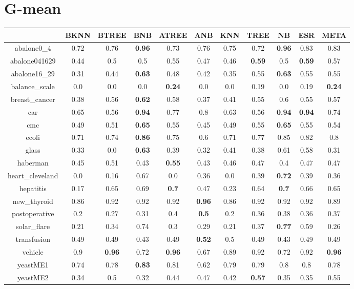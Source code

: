 \documentclass{article}%
\begin{document}
\section*{G{-}mean}%
\begin{tabular}{c|cccccccccc}%
\hline%
&BKNN&BTREE&BNB&ATREE&ANB&KNN&TREE&NB&ESR&META\\%
\hline%
abalone0\_4&0.72&0.76&\textbf{0.96}&0.73&0.76&0.75&0.72&\textbf{0.96}&0.83&0.83\\%
\hline%
abalone041629&0.44&0.5&0.5&0.55&0.47&0.46&\textbf{0.59}&0.5&\textbf{0.59}&0.57\\%
\hline%
abalone16\_29&0.31&0.44&\textbf{0.63}&0.48&0.42&0.35&0.55&\textbf{0.63}&0.55&0.55\\%
\hline%
balance\_scale&0.0&0.0&0.0&\textbf{0.24}&0.0&0.0&0.19&0.0&0.19&\textbf{0.24}\\%
\hline%
breast\_cancer&0.38&0.56&\textbf{0.62}&0.58&0.37&0.41&0.55&0.6&0.55&0.57\\%
\hline%
car&0.65&0.56&\textbf{0.94}&0.77&0.8&0.63&0.56&\textbf{0.94}&\textbf{0.94}&0.74\\%
\hline%
cmc&0.49&0.51&\textbf{0.65}&0.55&0.45&0.49&0.55&\textbf{0.65}&0.55&0.54\\%
\hline%
ecoli&0.71&0.74&\textbf{0.86}&0.75&0.6&0.71&0.77&0.85&0.82&0.8\\%
\hline%
glass&0.33&0.0&\textbf{0.63}&0.39&0.32&0.41&0.38&0.61&0.58&0.31\\%
\hline%
haberman&0.45&0.51&0.43&\textbf{0.55}&0.43&0.46&0.47&0.4&0.47&0.47\\%
\hline%
heart\_cleveland&0.0&0.16&0.67&0.0&0.36&0.0&0.39&\textbf{0.72}&0.39&0.36\\%
\hline%
hepatitis&0.17&0.65&0.69&\textbf{0.7}&0.47&0.23&0.64&\textbf{0.7}&0.66&0.65\\%
\hline%
new\_thyroid&0.86&0.92&0.92&0.92&\textbf{0.96}&0.86&0.92&0.92&0.92&0.89\\%
\hline%
postoperative&0.2&0.27&0.31&0.4&\textbf{0.5}&0.2&0.36&0.38&0.36&0.37\\%
\hline%
solar\_flare&0.21&0.34&0.74&0.3&0.29&0.21&0.37&\textbf{0.77}&0.59&0.26\\%
\hline%
transfusion&0.49&0.49&0.43&0.49&\textbf{0.52}&0.5&0.49&0.43&0.49&0.49\\%
\hline%
vehicle&0.9&\textbf{0.96}&0.72&\textbf{0.96}&0.67&0.89&0.92&0.72&0.92&\textbf{0.96}\\%
\hline%
yeastME1&0.74&0.78&\textbf{0.83}&0.81&0.62&0.79&0.79&0.8&0.8&0.78\\%
\hline%
yeastME2&0.34&0.5&0.32&0.44&0.47&0.42&\textbf{0.57}&0.35&0.35&0.55\\%

\end{tabular}
\end{document}
